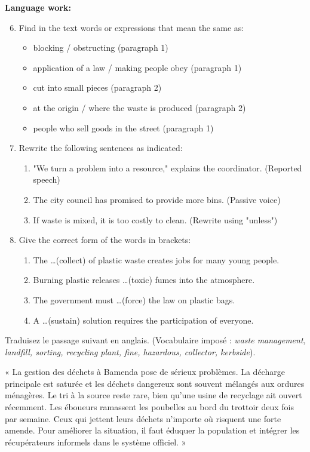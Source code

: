 \documentclass[11pt]{article}
\begin{document}
\begin{exercice}
\textbf{Language work:}
\begin{enumerate}
\setcounter{enumi}{5}
\item Find in the text words or expressions that mean the same as:
\begin{itemize}
\item[a)] blocking / obstructing (paragraph 1)
\item[b)] application of a law / making people obey (paragraph 1)
\item[c)] cut into small pieces (paragraph 2)
\item[d)] at the origin / where the waste is produced (paragraph 2)
\item[e)] people who sell goods in the street (paragraph 1)
\end{itemize}
\item Rewrite the following sentences as indicated:
\begin{enumerate}
\item "We turn a problem into a resource," explains the coordinator. (Reported speech)
\item The city council has promised to provide more bins. (Passive voice)
\item If waste is mixed, it is too costly to clean. (Rewrite using "unless")
\end{enumerate}
\item Give the correct form of the words in brackets:
\begin{enumerate}
\item The \dots (collect) of plastic waste creates jobs for many young people.
\item Burning plastic releases \dots (toxic) fumes into the atmosphere.
\item The government must \dots (force) the law on plastic bags.
\item A \dots (sustain) solution requires the participation of everyone.
\end{enumerate}
\end{enumerate}
\end{exercice}

\begin{exercice}
Traduisez le passage suivant en anglais. (Vocabulaire imposé : \textit{waste management, landfill, sorting, recycling plant, fine, hazardous, collector, kerbside}).

« La gestion des déchets à Bamenda pose de sérieux problèmes. La décharge principale est saturée et les déchets dangereux sont souvent mélangés aux ordures ménagères. Le tri à la source reste rare, bien qu'une usine de recyclage ait ouvert récemment. Les éboueurs ramassent les poubelles au bord du trottoir deux fois par semaine. Ceux qui jettent leurs déchets n'importe où risquent une forte amende. Pour améliorer la situation, il faut éduquer la population et intégrer les récupérateurs informels dans le système officiel. »
\end{exercice}
\end{document}
